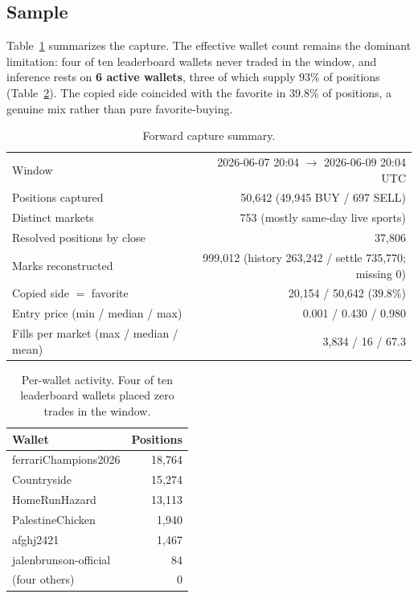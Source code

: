 \documentclass[11pt]{article}
\begin{document}
\subsection{Sample}
Table~\ref{tab:sample} summarizes the capture. The effective wallet count remains the dominant
limitation: four of ten leaderboard wallets never traded in the window, and inference rests on
\textbf{6 active wallets}, three of which supply $93\%$ of positions (Table~\ref{tab:wallets}).
The copied side coincided with the favorite in $39.8\%$ of positions, a genuine mix rather than
pure favorite-buying.

\begin{table}[h]
\centering
\caption{Forward capture summary.}
\label{tab:sample}
\small
\begin{tabular}{@{}lr@{}}
\toprule
Window & 2026-06-07 20:04 $\to$ 2026-06-09 20:04 UTC \\
Positions captured & 50{,}642 (49{,}945 BUY / 697 SELL) \\
Distinct markets & 753 (mostly same-day live sports) \\
Resolved positions by close & 37{,}806 \\
Marks reconstructed & 999{,}012 (history 263{,}242 / settle 735{,}770; missing 0) \\
Copied side $=$ favorite & 20{,}154 / 50{,}642 \;($39.8\%$) \\
Entry price (min / median / max) & 0.001 / 0.430 / 0.980 \\
Fills per market (max / median / mean) & 3{,}834 / 16 / 67.3 \\
\bottomrule
\end{tabular}
\end{table}

\begin{table}[h]
\centering
\caption{Per-wallet activity. Four of ten leaderboard wallets placed zero trades in the window.}
\label{tab:wallets}
\small
\begin{tabular}{@{}lr@{}}
\toprule
Wallet & Positions \\
\midrule
ferrariChampions2026  & 18{,}764 \\
Countryside           & 15{,}274 \\
HomeRunHazard         & 13{,}113 \\
PalestineChicken      & 1{,}940 \\
afghj2421             & 1{,}467 \\
jalenbrunson-official & 84 \\
(four others)         & 0 \\
\bottomrule
\end{tabular}
\end{table}
\end{document}
